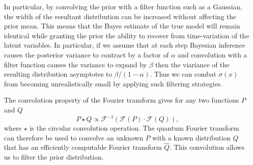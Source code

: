 \documentclass[aps,amsmath,onecolumn,amssymb]{revtex4}
\begin{document}
In particular, by convolving the prior with a filter function such as a
Gaussian, the width of the resultant distribution can be increased without
affecting the prior mean.  This means that the Bayes estimate of the true
model will remain identical while granting the prior the ability to recover
from time-variation of the latent variables.  In particular, if we assume
that at each step Bayesian inference causes the posterior variance to contract
by a factor of $\alpha$ and  convolution with a filter function causes the
variance to expand by $\beta$ then the viariance of the resulting distribution
asymptotes to $\beta/(1-\alpha)$. Thus we can combat $\sigma(x)$ from becoming
unrealistically small by applying such filtering strategies.

The convolution property of the Fourier transform gives for any two functions $P$ and $Q$
\begin{equation}
P \star Q \propto \mathcal{F}^{-1}\left(\mathcal{F}(P) \cdot \mathcal{F}(Q) \right),\label{eq:conv}
\end{equation}
where $\star$ is the circular convolution operation.
The quantum Fourier transform can therefore be used to convolve an unknown $P$ with a known distribution $Q$ that has an efficiently computable Fourier transform $\hat{Q}$.  This
convolution allows us to filter the prior distribution.
\end{document}
